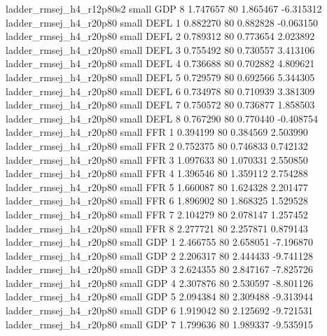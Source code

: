 ladder_rmsej_h4_r12p80s2      small      GDP                 8 1.747657 80       1.865467          -6.315312
  ladder_rmsej_h4_r20p80      small     DEFL                 1 0.882270 80       0.882828          -0.063150
  ladder_rmsej_h4_r20p80      small     DEFL                 2 0.789312 80       0.773654           2.023892
  ladder_rmsej_h4_r20p80      small     DEFL                 3 0.755492 80       0.730557           3.413106
  ladder_rmsej_h4_r20p80      small     DEFL                 4 0.736688 80       0.702882           4.809621
  ladder_rmsej_h4_r20p80      small     DEFL                 5 0.729579 80       0.692566           5.344305
  ladder_rmsej_h4_r20p80      small     DEFL                 6 0.734978 80       0.710939           3.381309
  ladder_rmsej_h4_r20p80      small     DEFL                 7 0.750572 80       0.736877           1.858503
  ladder_rmsej_h4_r20p80      small     DEFL                 8 0.767290 80       0.770440          -0.408754
  ladder_rmsej_h4_r20p80      small      FFR                 1 0.394199 80       0.384569           2.503990
  ladder_rmsej_h4_r20p80      small      FFR                 2 0.752375 80       0.746833           0.742132
  ladder_rmsej_h4_r20p80      small      FFR                 3 1.097633 80       1.070331           2.550850
  ladder_rmsej_h4_r20p80      small      FFR                 4 1.396546 80       1.359112           2.754288
  ladder_rmsej_h4_r20p80      small      FFR                 5 1.660087 80       1.624328           2.201477
  ladder_rmsej_h4_r20p80      small      FFR                 6 1.896902 80       1.868325           1.529528
  ladder_rmsej_h4_r20p80      small      FFR                 7 2.104279 80       2.078147           1.257452
  ladder_rmsej_h4_r20p80      small      FFR                 8 2.277721 80       2.257871           0.879143
  ladder_rmsej_h4_r20p80      small      GDP                 1 2.466755 80       2.658051          -7.196870
  ladder_rmsej_h4_r20p80      small      GDP                 2 2.206317 80       2.444433          -9.741128
  ladder_rmsej_h4_r20p80      small      GDP                 3 2.624355 80       2.847167          -7.825726
  ladder_rmsej_h4_r20p80      small      GDP                 4 2.307876 80       2.530597          -8.801126
  ladder_rmsej_h4_r20p80      small      GDP                 5 2.094384 80       2.309488          -9.313944
  ladder_rmsej_h4_r20p80      small      GDP                 6 1.919042 80       2.125692          -9.721531
  ladder_rmsej_h4_r20p80      small      GDP                 7 1.799636 80       1.989337          -9.535915
